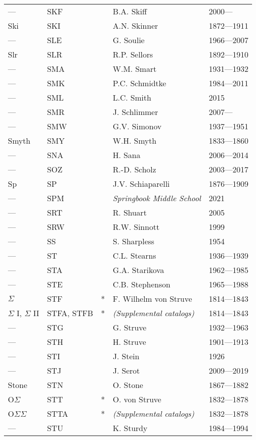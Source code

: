 \begin{longtable}{l|l|c|p{59mm}|l}
--- & SKF &   & B.A. Skiff & 2000--- \\
Ski & SKI &   & A.N. Skinner & 1872---1911 \\
--- & SLE &   & G. Soulie & 1966---2007 \\
Slr & SLR &   & R.P. Sellors & 1892---1910 \\
--- & SMA &   & W.M. Smart & 1931---1932 \\
--- & SMK &   & P.C. Schmidtke & 1984---2011 \\
--- & SML &   & L.C. Smith & 2015 \\
--- & SMR &   & J. Schlimmer & 2007--- \\
--- & SMW &   & G.V. Simonov & 1937---1951 \\
Smyth & SMY &   & W.H. Smyth & 1833---1860 \\
--- & SNA &   & H. Sana & 2006---2014 \\
--- & SOZ &   & R.-D. Scholz & 2003---2017 \\
Sp  & SP  &   & J.V. Schiaparelli & 1876---1909 \\
--- & SPM &   & \emph{Springbook Middle School} & 2021 \\
--- & SRT &   & R. Shuart & 2005 \\
--- & SRW &   & R.W. Sinnott & 1999 \\
--- & SS  &   & S. Sharpless & 1954 \\
--- & ST  &   & C.L. Stearns & 1936---1939 \\
--- & STA &   & G.A. Starikova & 1962---1985 \\
--- & STE &   & C.B. Stephenson & 1965---1988 \\
$\Sigma$ & STF & *  & F. Wilhelm von Struve & 1814---1843 \\
$\Sigma$ I, $\Sigma$ II & STFA, STFB & *  & \emph{(Supplemental catalogs)} & 1814---1843 \\
--- & STG &   & G. Struve & 1932---1963 \\
--- & STH &   & H. Struve & 1901---1913 \\
--- & STI &   & J. Stein & 1926 \\
--- & STJ &   & J. Serot & 2009---2019 \\
Stone & STN &   & O. Stone & 1867---1882 \\
O$\Sigma$ & STT & *  & O. von Struve & 1832---1878 \\
O$\Sigma\Sigma$ & STTA & *  & \emph{(Supplemental catalogs)} & 1832---1878 \\
--- & STU &   & K. Sturdy & 1984---1994 \\

\end{longtable}

